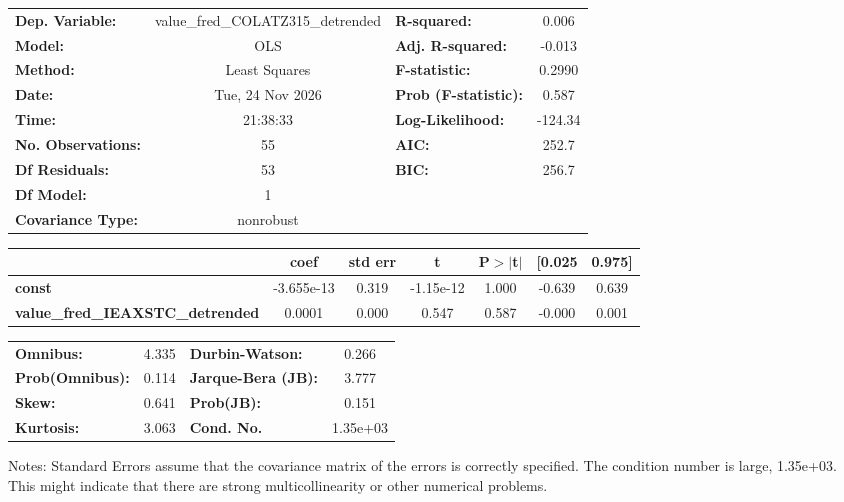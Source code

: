 \begin{center}
\begin{tabular}{lclc}
\toprule
\textbf{Dep. Variable:}                  & value\_fred\_COLATZ315\_detrended & \textbf{  R-squared:         } &     0.006   \\
\textbf{Model:}                          &                OLS                & \textbf{  Adj. R-squared:    } &    -0.013   \\
\textbf{Method:}                         &           Least Squares           & \textbf{  F-statistic:       } &    0.2990   \\
\textbf{Date:}                           &          Tue, 24 Nov 2026         & \textbf{  Prob (F-statistic):} &    0.587    \\
\textbf{Time:}                           &              21:38:33             & \textbf{  Log-Likelihood:    } &   -124.34   \\
\textbf{No. Observations:}               &                   55              & \textbf{  AIC:               } &     252.7   \\
\textbf{Df Residuals:}                   &                   53              & \textbf{  BIC:               } &     256.7   \\
\textbf{Df Model:}                       &                    1              & \textbf{                     } &             \\
\textbf{Covariance Type:}                &             nonrobust             & \textbf{                     } &             \\
\bottomrule
\end{tabular}
\begin{tabular}{lcccccc}
                                         & \textbf{coef} & \textbf{std err} & \textbf{t} & \textbf{P$> |$t$|$} & \textbf{[0.025} & \textbf{0.975]}  \\
\midrule
\textbf{const}                           &   -3.655e-13  &        0.319     & -1.15e-12  &         1.000        &       -0.639    &        0.639     \\
\textbf{value\_fred\_IEAXSTC\_detrended} &       0.0001  &        0.000     &     0.547  &         0.587        &       -0.000    &        0.001     \\
\bottomrule
\end{tabular}
\begin{tabular}{lclc}
\textbf{Omnibus:}       &  4.335 & \textbf{  Durbin-Watson:     } &    0.266  \\
\textbf{Prob(Omnibus):} &  0.114 & \textbf{  Jarque-Bera (JB):  } &    3.777  \\
\textbf{Skew:}          &  0.641 & \textbf{  Prob(JB):          } &    0.151  \\
\textbf{Kurtosis:}      &  3.063 & \textbf{  Cond. No.          } & 1.35e+03  \\
\bottomrule
\end{tabular}
\end{center}

Notes: \newline
 [1] Standard Errors assume that the covariance matrix of the errors is correctly specified. \newline
 [2] The condition number is large, 1.35e+03. This might indicate that there are \newline
 strong multicollinearity or other numerical problems.